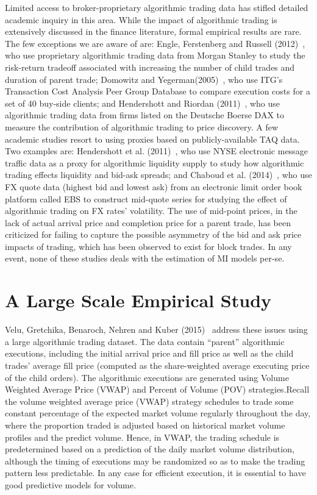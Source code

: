 Limited access to broker-proprietary algorithmic trading data has stifled detailed academic inquiry in this area. While the impact of algorithmic trading is extensively discussed in the finance literature, formal empirical results are rare. The few exceptions we are aware of are: Engle, Ferstenberg and Russell (2012)~\cite{engle2012}, who use proprietary algorithmic trading data from Morgan Stanley to study the risk-return tradeoff associated with increasing the number of child trades and duration of parent trade; Domowitz and Yegerman(2005)~\cite{doye}, who use ITG's Transaction Cost Analysis Peer Group Database to compare execution costs for a set of 40 buy-side clients; and Hendershott and Riordan (2011)~\cite{hernderrio}, who use algorithmic trading data from firms listed on the Deutsche Boerse DAX to measure the contribution of algorithmic trading to price discovery. A few academic studies resort to using proxies based on publicly-available TAQ data. Two examples are: Hendershott et al. (2011)~\cite{hender2011}, who use NYSE electronic message traffic data as a proxy for algorithmic liquidity supply to study how algorithmic trading effects liquidity and bid-ask spreads; and Chaboud et al. (2014)~\cite{chaboud}, who use FX quote data (highest bid and lowest ask) from an electronic limit order book platform called EBS to construct mid-quote series for studying the effect of algorithmic trading on FX rates' volatility. The use of mid-point prices, in the lack of actual arrival price and completion price for a parent trade, has been criticized for failing to capture the possible asymmetry of the bid and ask price impacts of trading, which has been observed to exist for block trades. In any event, none of these studies deals with the estimation of MI models per-se.



\section{A Large Scale Empirical Study}

Velu, Gretchika, Benaroch, Nehren and Kuber (2015)~\cite{unpub} address these issues using a large algorithmic trading dataset. The data contain ``parent'' algorithmic executions, including the initial arrival price and fill price as well as the child trades' average fill price (computed as the share-weighted average executing price of the child orders). The algorithmic executions are generated using Volume Weighted Average Price (VWAP) and Percent of Volume (POV) strategies.Recall the volume weighted average price (VWAP) strategy schedules to trade some constant percentage of the expected market volume regularly throughout the day, where the proportion traded is adjusted based on historical market volume profiles and the predict volume. Hence, in VWAP, the trading schedule is predetermined based on a prediction of the daily market volume distribution, although the timing of executions may be randomized so as to make the trading pattern less predictable. In any case for efficient execution, it is essential to have good predictive models for volume. 


